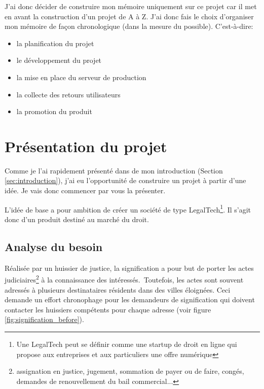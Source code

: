 \documentclass[]{report}
\begin{document}
    J'ai donc décider de construire mon mémoire uniquement sur ce projet car il met en avant la construction d'un projet de A à Z. J'ai donc fais le choix d'organiser mon mémoire de façon chronologique (dans la mesure du possible). C'est-à-dire:

    \begin{itemize}
      \item la planification du projet
      \item le développement du projet
      \item la mise en place du serveur de production
      \item la collecte des retours utilisateurs
      \item la promotion du produit
    \end{itemize}


\chapter{Présentation du projet}

  Comme je l'ai rapidement présenté dans de mon introduction (Section \ref{sec:introduction}), j'ai eu l'opportunité de construire un projet à partir d'une idée. Je vais donc commencer par vous la présenter.

  L'idée de base a pour ambition de créer un société de type LegalTech\footnote{Une LegalTech peut se définir comme une startup de droit en ligne qui propose aux entreprises et aux particuliers une offre numérique}. Il s'agit donc d'un produit destiné au marché du droit.

  \section{Analyse du besoin}

    Réalisée par un huissier de justice, la signification a pour but de porter les actes judiciaires\footnote{assignation en justice, jugement, sommation de payer ou de faire, congés, demandes de renouvellement du bail commercial...} à la connaissance des intéressés. Toutefois, les actes sont souvent adressés à plusieurs destinataires résidents dans des villes éloignées. Ceci demande un effort chronophage pour les demandeurs de signification qui doivent contacter les huissiers compétents pour chaque adresse (voir figure \ref{fig:signification_before}).
\end{document}
